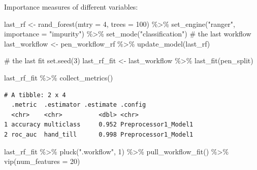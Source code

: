 \documentclass[
  letterpaper,
  DIV=11,
  numbers=noendperiod]{scrreprt}
\newenvironment{Shaded}{\begin{snugshade}}{\end{snugshade}}
\newcommand{\AttributeTok}[1]{\textcolor[rgb]{0.40,0.45,0.13}{#1}}
\newcommand{\CommentTok}[1]{\textcolor[rgb]{0.37,0.37,0.37}{#1}}
\newcommand{\DecValTok}[1]{\textcolor[rgb]{0.68,0.00,0.00}{#1}}
\newcommand{\FunctionTok}[1]{\textcolor[rgb]{0.28,0.35,0.67}{#1}}
\newcommand{\NormalTok}[1]{\textcolor[rgb]{0.00,0.23,0.31}{#1}}
\newcommand{\OtherTok}[1]{\textcolor[rgb]{0.00,0.23,0.31}{#1}}
\newcommand{\SpecialCharTok}[1]{\textcolor[rgb]{0.37,0.37,0.37}{#1}}
\newcommand{\StringTok}[1]{\textcolor[rgb]{0.13,0.47,0.30}{#1}}
\begin{document}
Importance measures of different variables:

\begin{Shaded}
\begin{Highlighting}[]
\NormalTok{last\_rf }\OtherTok{\textless{}{-}} 
  \FunctionTok{rand\_forest}\NormalTok{(}\AttributeTok{mtry =} \DecValTok{4}\NormalTok{, }\AttributeTok{trees =} \DecValTok{100}\NormalTok{) }\SpecialCharTok{\%\textgreater{}\%} 
  \FunctionTok{set\_engine}\NormalTok{(}\StringTok{"ranger"}\NormalTok{,  }\AttributeTok{importance =} \StringTok{"impurity"}\NormalTok{) }\SpecialCharTok{\%\textgreater{}\%} 
  \FunctionTok{set\_mode}\NormalTok{(}\StringTok{"classification"}\NormalTok{)}
\CommentTok{\# the last workflow}
\NormalTok{last\_workflow }\OtherTok{\textless{}{-}} 
\NormalTok{  pen\_workflow\_rf }\SpecialCharTok{\%\textgreater{}\%} 
  \FunctionTok{update\_model}\NormalTok{(last\_rf)}

\CommentTok{\# the last fit}
\FunctionTok{set.seed}\NormalTok{(}\DecValTok{3}\NormalTok{)}
\NormalTok{last\_rf\_fit }\OtherTok{\textless{}{-}} 
\NormalTok{  last\_workflow }\SpecialCharTok{\%\textgreater{}\%} 
  \FunctionTok{last\_fit}\NormalTok{(pen\_split)}
\end{Highlighting}
\end{Shaded}

\begin{Shaded}
\begin{Highlighting}[]
\NormalTok{last\_rf\_fit }\SpecialCharTok{\%\textgreater{}\%} 
  \FunctionTok{collect\_metrics}\NormalTok{()}
\end{Highlighting}
\end{Shaded}

\begin{verbatim}
# A tibble: 2 x 4
  .metric  .estimator .estimate .config             
  <chr>    <chr>          <dbl> <chr>               
1 accuracy multiclass     0.952 Preprocessor1_Model1
2 roc_auc  hand_till      0.998 Preprocessor1_Model1
\end{verbatim}

\begin{Shaded}
\begin{Highlighting}[]
\NormalTok{last\_rf\_fit }\SpecialCharTok{\%\textgreater{}\%} 
  \FunctionTok{pluck}\NormalTok{(}\StringTok{".workflow"}\NormalTok{, }\DecValTok{1}\NormalTok{) }\SpecialCharTok{\%\textgreater{}\%}   
  \FunctionTok{pull\_workflow\_fit}\NormalTok{() }\SpecialCharTok{\%\textgreater{}\%} 
  \FunctionTok{vip}\NormalTok{(}\AttributeTok{num\_features =} \DecValTok{20}\NormalTok{)}
\end{Highlighting}
\end{Shaded}
\end{document}
